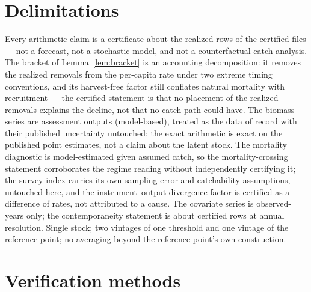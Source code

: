 \documentclass[10pt,twocolumn]{article}
\theoremstyle{plain}
\theoremstyle{remark}
\begin{document}
\section{Delimitations}\label{scope}

Every arithmetic claim is a certificate about the realized rows of the
certified files --- not a forecast, not a stochastic model, and not a
counterfactual catch analysis. The bracket of
Lemma~\ref{lem:bracket} is an accounting decomposition: it removes the
realized removals from the per-capita rate under two extreme timing
conventions, and its harvest-free factor still conflates natural
mortality with recruitment --- the certified statement is that no
placement of the realized removals explains the decline, not that no
catch path could have. The biomass series are assessment outputs
(model-based), treated as the data of record with their published
uncertainty untouched; the exact arithmetic is exact on the published
point estimates, not a claim about the latent stock. The mortality
diagnostic is model-estimated given assumed catch, so the
mortality-crossing statement corroborates the regime reading without
independently certifying it; the survey index carries its own sampling
error and catchability assumptions, untouched here, and the
instrument--output divergence factor is certified as a difference of
rates, not attributed to a cause. The covariate series is
observed-years only; the contemporaneity statement is about certified
rows at annual resolution. Single stock; two vintages of one threshold
and one vintage of the reference point; no averaging beyond the
reference point's own construction.

\section{Verification methods}\label{methods}
\end{document}
